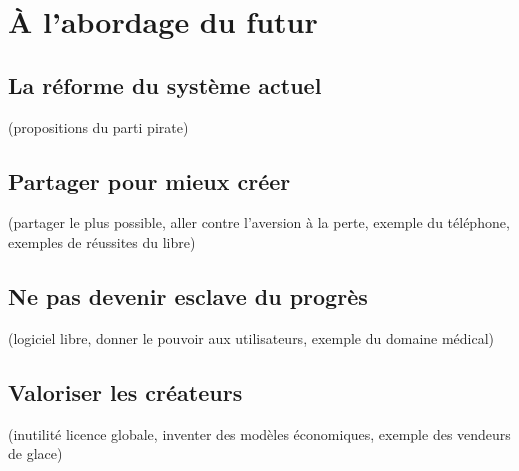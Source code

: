 \chapter{À l'abordage du futur}

\section{La réforme du système actuel}
(propositions du parti pirate)
\section{Partager pour mieux créer}
(partager le plus possible, aller contre l'aversion à la perte, exemple du téléphone, exemples de réussites du libre)
\section{Ne pas devenir esclave du progrès}
(logiciel libre, donner le pouvoir aux utilisateurs, exemple du domaine médical)
\section{Valoriser les créateurs}
(inutilité licence globale, inventer des modèles économiques, exemple des vendeurs de glace)
